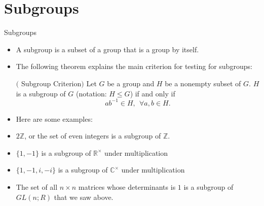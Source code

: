 \documentclass[ %
 10pt, xcolor={dvipsnames,svgnames,x11names,hyperref},
   hyperref={colorlinks=true,citecolor=green,linkcolor=DarkRed,urlcolor=ProcessBlue,anchorcolor=blue}
  ]{beamer}
\newenvironment{stepitemize}{\begin{itemize}[<+->]}{\end{itemize} }
\newcommand{\Z}{\mathbb{Z}}
\newcommand{\R}{\mathbb{R}}
\newcommand{\C}{\mathbb{C}}
\begin{document}
\section{Subgroups}
\begin{frame}{Subgroups}
    \begin{stepitemize}
    \item A subgroup is a subset of a group that is a group by itself.
    \item The following theorem explains the main criterion for testing for subgroups:
    \begin{theorem}$($ Subgroup Criterion$)$
Let $G$ be a group and $H$ be a nonempty subset of $G$. $H$ is a subgroup of $G$ (notation: $H\leq G$) if and only if
$$ab^{-1} \in H, \:\: \forall a,b\in H. $$
\end{theorem}

\end{stepitemize}
\end{frame}

\begin{frame}
\begin{stepitemize}
\item Here are some examples:

    \item $2\Z$, or the set of even integers is a subgroup of $\Z$.
    \item $\{1,-1\}$ is a subgroup of $\R^{\times}$ under multiplication
    \item $\{1,-1, i, -i\}$ is a subgroup of $\C^{\times}$ under multiplication
    \item The set of all $n\times n$ matrices whose determinants is $1$ is a subgroup of $GL(n;R)$ that we saw above.
    \end{stepitemize}
\end{frame}
\end{document}
